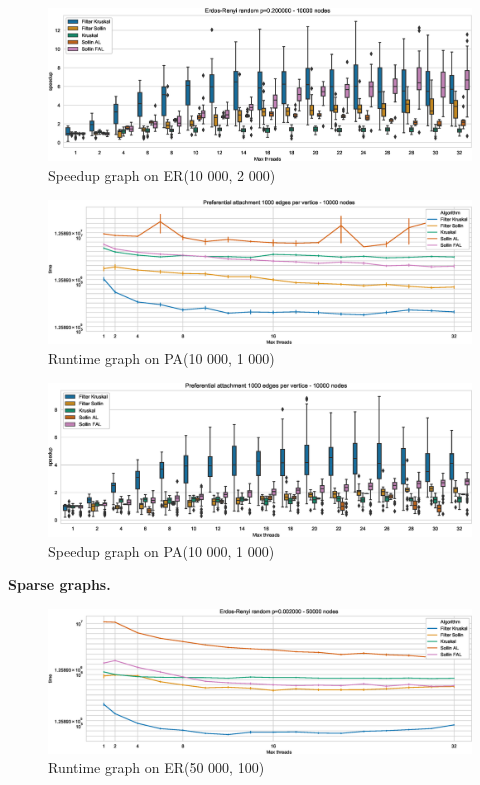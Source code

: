 \documentclass[letterpaper]{article}
\newcommand{\mypar}[1]{{\bf #1.}}
\begin{document}
\begin{figure}\centering
  \includegraphics[width=\linewidth]{graphics/Box_Speedup_Erdos-Renyi_random_p=0.200000_10000.eps}
  \caption{Speedup graph on ER(10 000, 2 000)\label{denseERspeedup}}
\end{figure}

\begin{figure}\centering
  \includegraphics[width=\linewidth]{graphics/Graph_runtime_Preferential_attachment_1000_edges_per_vertice_10000.eps}
  \caption{Runtime graph on PA(10 000, 1 000)\label{densePAruntime}}
\end{figure}

\begin{figure}\centering
  \includegraphics[width=\linewidth]{graphics/Box_Speedup_Preferential_attachment_1000_edges_per_vertice_10000.eps}
  \caption{Speedup graph on PA(10 000, 1 000)\label{densePAspeedup}}
\end{figure}



\mypar{Sparse graphs}

\begin{figure}\centering
  \includegraphics[width=\linewidth]{graphics/Graph_runtime_Erdos-Renyi_random_p=0.002000_50000.eps}
  \caption{Runtime graph on ER(50 000, 100)\label{sparseERruntime}}
\end{figure}
\end{document}
